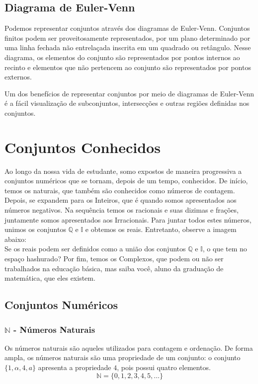 \subsection*{Diagrama de Euler-Venn}
Podemos representar conjuntos através dos diagramas de Euler-Venn. Conjuntos finitos podem ser proveitosamente representados, por um plano determinado por uma linha fechada não entrelaçada inscrita em um quadrado ou retângulo. Nesse diagrama, os elementos do conjunto são representados por pontos internos ao recinto e elementos que não pertencem ao conjunto são representados por pontos externos. \par 
Um dos benefícios de representar conjuntos por meio de diagramas de Euler-Venn é a fácil visualização de subconjuntos, intersecções e outras regiões definidas nos conjuntos.

\section{Conjuntos Conhecidos}
Ao longo da nossa vida de estudante, somo expostos de maneira progressiva a conjuntos numéricos que se tornam, depois de um tempo, conhecidos. De início, temos os naturais, que também são conhecidos como números de contagem. Depois, se expandem para os Inteiros, que é quando somos apresentados aos números negativos.%
Na sequência temos os racionais e suas dizimas e frações, juntamente somos apresentados aos Irracionais. Para juntar todos estes números, unimos os conjuntos $\mathbb{Q}$ e $\mathbb{I}$ e obtemos os reais. Entretanto, observe a imagem abaixo:\\
Se os reais podem ser definidos como a união dos conjuntos $\mathbb{Q}$ e $\mathbb{I}$, o que tem no espaço hashurado?
Por fim, temos os Complexos, que podem ou não ser trabalhados na educação básica, mas saiba você, aluno da graduação de matemática, que eles existem.

\subsection{Conjuntos Numéricos}
\subsubsection{$\mathbb{N}$ - Números Naturais}
Os números naturais são aqueles utilizados para contagem e ordenação. De forma ampla, os números naturais são uma propriedade de um conjunto: o conjunto $\{1,\alpha,4,a\}$ apresenta a propriedade $4$, pois possui quatro elementos. \[\mathbb{N}=\{0,1,2,3,4,5,\dots \}\]

